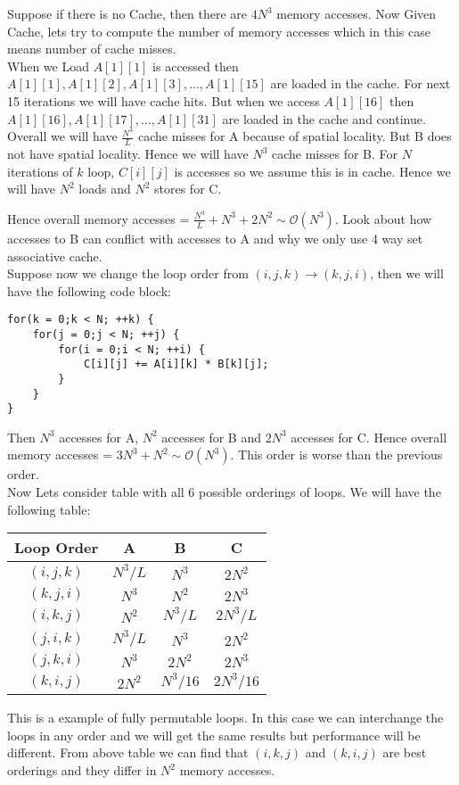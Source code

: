 \documentclass{article}
\begin{document}
Suppose if there is no Cache, then there are $4N^3$ memory accesses. Now Given Cache, lets try to compute the number of memory accesses which in this case means number of cache misses. \\

When we Load $A[1][1]$ is accessed then $A[1][1], A[1][2], A[1][3], \ldots, A[1][15]$ are loaded in the cache. For next 15 iterations we will have cache hits. But when we access $A[1][16]$ then $A[1][16], A[1][17], \ldots, A[1][31]$ are loaded in the cache and continue. \\

Overall we will have $\frac{N^3}{L}$ cache misses for A because of spatial locality. But B does not have spatial locality. Hence we will have $N^3$ cache misses for B. For $N$ iterations of $k$ loop, $C[i][j]$ is accesses so we assume this is in cache. Hence we will have $N^2$ loads and $N^2$ stores for C.

Hence overall memory accesses = $\frac{N^3}{L} + N^3 + 2N^2 \sim \mathcal{O}(N^3)$. Look about how accesses to B can conflict with accesses to A and why we only use 4 way set associative cache. \\

Suppose now we change the loop order from $(i,j,k) \rightarrow (k,j,i)$, then we will have the following code block:
\begin{lstlisting}
for(k = 0;k < N; ++k) {
    for(j = 0;j < N; ++j) {
        for(i = 0;i < N; ++i) {
            C[i][j] += A[i][k] * B[k][j];
        }
    }
}

\end{lstlisting}
Then $N^3$ accesses for A, $N^2$ accesses for B and $2N^3$ accesses for C. Hence overall memory accesses = $3N^3 + N^2 \sim \mathcal{O}(N^3)$. This order is worse than the previous order. \\

Now Lets consider table with all 6 possible orderings of loops. We will have the following table:
\begin{center}
    \begin{tabular}{|c|c|c|c|}
        \hline
        Loop Order & A & B & C \\
        \hline
        $(i,j,k)$ & $N^3/L$ & $N^3$ & $2N^2$ \\
        $(k,j,i)$ & $N^3$ & $N^2$ & $2N^3$ \\
        $(i,k,j)$ & $N^2$ & $N^3/L$ & $2N^3/L$ \\
        $(j,i,k)$ & $N^3/L$ & $N^3$ & $2N^2$ \\
        $(j,k,i)$ & $N^3$ & $2N^2$ & $2N^3$ \\
        $(k,i,j)$ & $2N^2$ & $N^3/16$ & $2N^3/16$ \\
        \hline
    \end{tabular}
\end{center}

This is a example of fully permutable loops. In this case we can interchange the loops in any order and we will get the same results but performance will be different. From above table we can find that $(i,k,j)$ and $(k,i,j)$ are best orderings and they differ in $N^2$ memory accesses. \\
\end{document}
